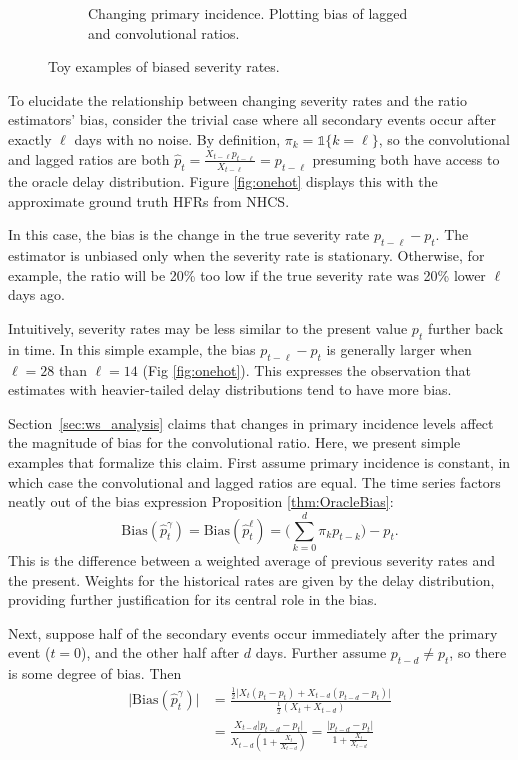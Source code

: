 \documentclass{article}
\renewcommand{\hat}{\widehat} %
\begin{document}
\begin{figure}
\begin{subfigure}[b]{0.45\linewidth}
         \caption{Changing primary incidence. Plotting bias of lagged and convolutional ratios.}
         \label{fig:chging_primary}
     \end{subfigure}
        \caption{Toy examples of biased severity rates.}
        \label{fig:bias_ex}
\end{figure}


To elucidate the relationship between changing severity rates and the ratio estimators' bias, consider the trivial case where all secondary events occur after exactly $\ell$ days with no noise. By definition, $\pi_k = \mathds{1}\{k=\ell\}$, so the convolutional and lagged ratios are both $\hat{p}_t = \frac{X_{t-\ell}p_{t-\ell}}{X_{t-\ell}} = p_{t-\ell}$ presuming both have access to the oracle delay distribution. Figure \ref{fig:onehot} displays this with the approximate ground truth HFRs from NHCS. 

In this case, the bias is the change in the true severity rate $p_{t-\ell} - p_t$. The estimator is unbiased only when the severity rate is stationary. Otherwise, for example, the ratio will be 20\% too low if the true severity rate was 20\% lower $\ell$ days ago. 

Intuitively, severity rates may be less similar to the present value $p_t$ further back in time. In this simple example, the bias $p_{t-\ell}-p_t$ is generally larger when $\ell=28$ than $\ell=14$ (Fig \ref{fig:onehot}). This expresses the observation that estimates with heavier-tailed delay distributions tend to have more bias. 

Section~\ref{sec:ws_analysis} claims that changes in primary incidence levels affect the magnitude of bias for the convolutional ratio. Here, we present simple examples that formalize this claim. First assume primary incidence is constant, in which case the convolutional and lagged ratios are equal. The time series factors neatly out of the bias expression  Proposition \ref{thm:OracleBias}:
$$\text{Bias}(\hat{p}_t^{\gamma}) = \text{Bias}(\hat{p}_t^\ell) = \Big(\sum_{k=0}^d \pi_k p_{t-k}\Big)-p_t.$$
\noindent This is the difference between a weighted average of previous severity rates and the present. Weights for the historical rates are given by the delay distribution, providing further justification for its central role in the bias. 

Next, suppose half of the secondary events occur immediately after the primary event ($t=0$), and the other half after $d$ days. Further assume $p_{t-d}\neq p_t$, so there is some degree of bias. Then
\begin{align*}
    \lvert\text{Bias}(\hat{p}_t^{\gamma})\rvert &= \frac{\frac{1}{2}\big\lvert X_{t}(p_t-p_t) + X_{t-d}(p_{t-d}-p_t)\big\rvert}{\frac{1}{2}(X_{t}+X_{t-d})} \\
    &=\frac{X_{t-d}\lvert p_{t-d}-p_t\rvert}{X_{t-d}(1+\frac{X_{t}}{X_{t-d}})} = \frac{\lvert p_{t-d}-p_t \rvert}{1+\frac{X_{t}}{X_{t-d}}}
\end{align*}
\end{document}
